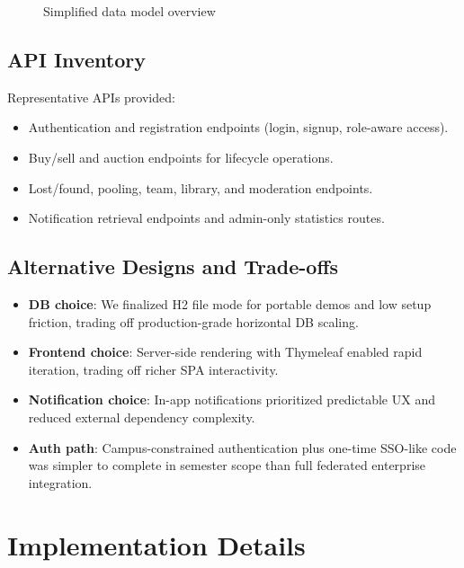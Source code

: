 \documentclass[12pt,a4paper]{article}
\begin{document}
\begin{figure}[H]
\centering
{}
\caption{Simplified data model overview}
\end{figure}

\subsection{API Inventory}
Representative APIs provided:
\begin{itemize}[leftmargin=*]
    \item Authentication and registration endpoints (login, signup, role-aware access).
    \item Buy/sell and auction endpoints for lifecycle operations.
    \item Lost/found, pooling, team, library, and moderation endpoints.
    \item Notification retrieval endpoints and admin-only statistics routes.
\end{itemize}

\subsection{Alternative Designs and Trade-offs}
\begin{itemize}[leftmargin=*]
    \item \textbf{DB choice}: We finalized H2 file mode for portable demos and low setup friction, trading off production-grade horizontal DB scaling.
    \item \textbf{Frontend choice}: Server-side rendering with Thymeleaf enabled rapid iteration, trading off richer SPA interactivity.
    \item \textbf{Notification choice}: In-app notifications prioritized predictable UX and reduced external dependency complexity.
    \item \textbf{Auth path}: Campus-constrained authentication plus one-time SSO-like code was simpler to complete in semester scope than full federated enterprise integration.
\end{itemize}

\newpage
\section{Implementation Details}
\end{document}

